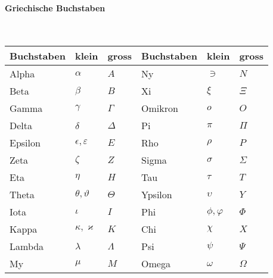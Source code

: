 \paragraph{Griechische Buchstaben}\mbox{}\\
\begin{tabularx}{\columnwidth}{@{}Xll|Xll@{}}
	\hline
	Buchstaben & klein                  & gross     & Buchstaben & klein      & gross    \\ \hline
	Alpha      & $\alpha$               & $A$       & Ny         & $\ni$      & $N$      \\ \hline
	Beta       & $\beta$                & $B$       & Xi         & $\xi$      & $\Xi$    \\ \hline
	Gamma      & $\gamma$               & $\Gamma$  & Omikron    & $o$        & $O$      \\ \hline
	Delta      & $\delta$               & $\Delta$  & Pi         & $\pi$      & $\Pi$    \\ \hline
	Epsilon    & $\epsilon,\varepsilon$ & $E$       & Rho        & $\rho$     & $P$      \\ \hline
	Zeta       & $\zeta$                & $Z$       & Sigma      & $\sigma$   & $\Sigma$ \\ \hline
	Eta        & $\eta$                 & $H$       & Tau        & $\tau$     & $T$      \\ \hline
	Theta      & $\theta,\vartheta$     & $\Theta$  & Ypsilon    & $\upsilon$ & $Y$      \\ \hline
	Iota       & $\iota$                & $I$       & Phi        & $\phi,\varphi$     & $\Phi$   \\ \hline
	Kappa      & $\kappa,\varkappa$     & $K$       & Chi        & $\chi$     & $X$      \\ \hline
	Lambda     & $\lambda$              & $\Lambda$ & Psi        & $\psi$     & $\Psi$   \\ \hline
	My         & $\mu$                  & $M$       & Omega      & $\omega$   & $\Omega$ \\ \hline
\end{tabularx}
\vspace{1mm}
